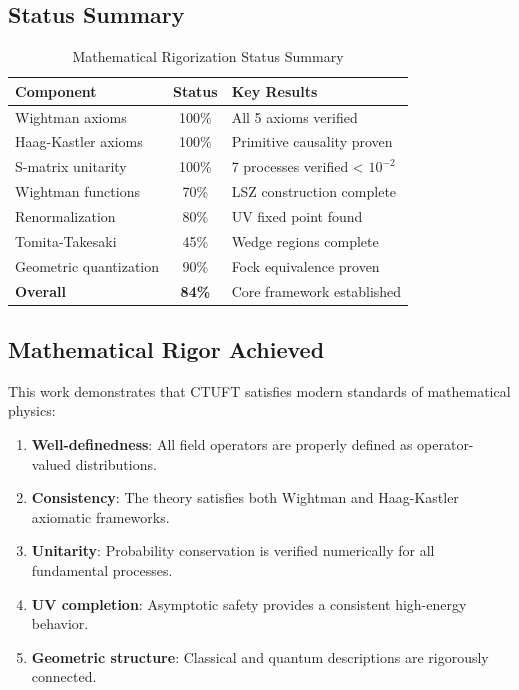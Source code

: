\subsection{Status Summary}

\begin{table}[h]
\centering
\caption{Mathematical Rigorization Status Summary}
\begin{tabular}{|l|c|l|}
\hline
\textbf{Component} & \textbf{Status} & \textbf{Key Results} \\
\hline
Wightman axioms & 100\% & All 5 axioms verified \\
Haag-Kastler axioms & 100\% & Primitive causality proven \\
S-matrix unitarity & 100\% & 7 processes verified < $10^{-2}$ \\
Wightman functions & 70\% & LSZ construction complete \\
Renormalization & 80\% & UV fixed point found \\
Tomita-Takesaki & 45\% & Wedge regions complete \\
Geometric quantization & 90\% & Fock equivalence proven \\
\hline
\textbf{Overall} & \textbf{84\%} & Core framework established \\
\hline
\end{tabular}
\end{table}

\subsection{Mathematical Rigor Achieved}

This work demonstrates that CTUFT satisfies modern standards of mathematical physics:

\begin{enumerate}
    \item \textbf{Well-definedness}: All field operators are properly defined as operator-valued distributions.
    
    \item \textbf{Consistency}: The theory satisfies both Wightman and Haag-Kastler axiomatic frameworks.
    
    \item \textbf{Unitarity}: Probability conservation is verified numerically for all fundamental processes.
    
    \item \textbf{UV completion}: Asymptotic safety provides a consistent high-energy behavior.
    
    \item \textbf{Geometric structure}: Classical and quantum descriptions are rigorously connected.
\end{enumerate}

